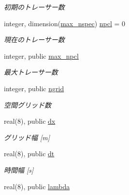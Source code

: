 \begin{DoxyCompactItemize}
\begin{DoxyCompactList}\small\item\em 初期のトレーサー数 \end{DoxyCompactList}\item 
\hypertarget{classparameters_a2c180b386f7fb11064a4423455d94fb0}{integer, dimension(\hyperlink{classparameters_a402ac2b1acba21a0e9487023da144ca0}{max\-\_\-nspec}) \hyperlink{classparameters_a2c180b386f7fb11064a4423455d94fb0}{npcl} = 0}\label{classparameters_a2c180b386f7fb11064a4423455d94fb0}

\begin{DoxyCompactList}\small\item\em 現在のトレーサー数 \end{DoxyCompactList}\item 
\hypertarget{classparameters_a2c661e9f0ecb692fa28dd0fbd480f7c9}{integer, public \hyperlink{classparameters_a2c661e9f0ecb692fa28dd0fbd480f7c9}{max\-\_\-npcl}}\label{classparameters_a2c661e9f0ecb692fa28dd0fbd480f7c9}

\begin{DoxyCompactList}\small\item\em 最大トレーサー数 \end{DoxyCompactList}\item 
\hypertarget{classparameters_a1eb0ee3801e2cfbb11b555688923e8ec}{integer, public \hyperlink{classparameters_a1eb0ee3801e2cfbb11b555688923e8ec}{ngrid}}\label{classparameters_a1eb0ee3801e2cfbb11b555688923e8ec}

\begin{DoxyCompactList}\small\item\em 空間グリッド数 \end{DoxyCompactList}\item 
\hypertarget{classparameters_ae1f1868cfabf07bcb8083445393b14d4}{real(8), public \hyperlink{classparameters_ae1f1868cfabf07bcb8083445393b14d4}{dx}}\label{classparameters_ae1f1868cfabf07bcb8083445393b14d4}

\begin{DoxyCompactList}\small\item\em グリッド幅 \mbox{[}m\mbox{]} \end{DoxyCompactList}\item 
\hypertarget{classparameters_af44276aeec84d75019f6780b191dcf17}{real(8), public \hyperlink{classparameters_af44276aeec84d75019f6780b191dcf17}{dt}}\label{classparameters_af44276aeec84d75019f6780b191dcf17}

\begin{DoxyCompactList}\small\item\em 時間幅 \mbox{[}s\mbox{]} \end{DoxyCompactList}\item 
\hypertarget{classparameters_a30fce8c77933f979f131c30f73ad76c4}{real(8), public \hyperlink{classparameters_a30fce8c77933f979f131c30f73ad76c4}{lambda}}\label{classparameters_a30fce8c77933f979f131c30f73ad76c4}


\end{DoxyCompactItemize}

